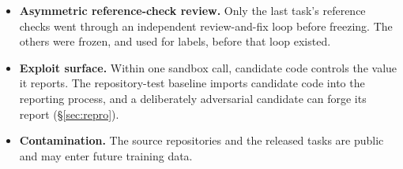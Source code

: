 \begin{itemize}
\item \textbf{Asymmetric reference-check review.} Only the last task's reference checks went through an independent review-and-fix loop before freezing. The others were frozen, and used for labels, before that loop existed.
\item \textbf{Exploit surface.} Within one sandbox call, candidate code controls the value it reports. The repository-test baseline imports candidate code into the reporting process, and a deliberately adversarial candidate can forge its report (\S\ref{sec:repro}).
\item \textbf{Contamination.} The source repositories and the released tasks are public and may enter future training data.
\end{itemize}
